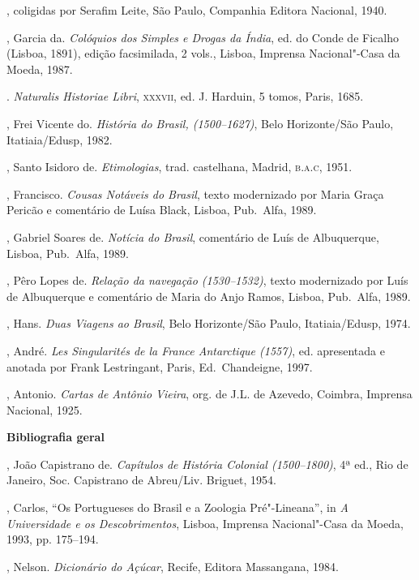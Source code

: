 \begin{bibliohedra}
, coligidas por
Serafim Leite, São Paulo, Companhia Editora Nacional, 1940.

, Garcia da. \textit{Colóquios dos Simples e Drogas da Índia}, ed.
do Conde de Ficalho (Lisboa, 1891), edição facsimilada, 2
vols., Lisboa, Imprensa Nacional"-Casa da Moeda, 1987.

. \textit{Naturalis Historiae Libri}, \textsc{xxxvii}, ed. J. Harduin, 5
tomos, Paris, 1685.

, Frei Vicente do. \textit{História do Brasil, (1500--1627)}, 
Belo Horizonte/São Paulo, Itatiaia/Edusp, 1982.

, Santo Isidoro de. \textit{Etimologias}, trad. castelhana,
Madrid, \textsc{b.a.c}, 1951.

, Francisco. \textit{Cousas Notáveis do Brasil}, texto
modernizado por Maria Graça Pericão e comentário de Luísa Black,
Lisboa, Pub.~Alfa, 1989.

, Gabriel Soares de. \textit{Notícia do Brasil}, comentário de
Luís de Albuquerque, Lisboa, Pub.~Alfa, 1989.

, Pêro Lopes de. \textit{Relação da navegação (1530--1532)}, texto
modernizado por Luís de Albuquerque e comentário de Maria do Anjo
Ramos, Lisboa, Pub.~Alfa, 1989.

, Hans. \textit{Duas Viagens ao Brasil}, Belo Horizonte/São
Paulo, Itatiaia/Edusp, 1974.

, André. \textit{Les Singularités de la France Antarctique
(1557)}, ed. apresentada e anotada por Frank Lestringant, Paris, Ed.~Chandeigne, 1997.

, Antonio. \textit{Cartas de Antônio Vieira}, org. de J.L. de
Azevedo, Coimbra, Imprensa Nacional, 1925.

\vspace*{2ex}
\scriptsize\textbf{Bibliografia geral}


, João Capistrano de. \textit{Capítulos de História Colonial
(1500--1800)}, 4ª ed., Rio de Janeiro, Soc. Capistrano de Abreu/Liv.
Briguet, 1954.

, Carlos, ``Os Portugueses do Brasil e a Zoologia Pré"-Lineana'', in
\textit{A Universidade e os Descobrimentos}, Lisboa, Imprensa
Nacional"-Casa da Moeda, 1993, pp. 175--194.

, Nelson. \textit{Dicionário do Açúcar}, Recife, Editora
Massangana, 1984.


\end{bibliohedra}
